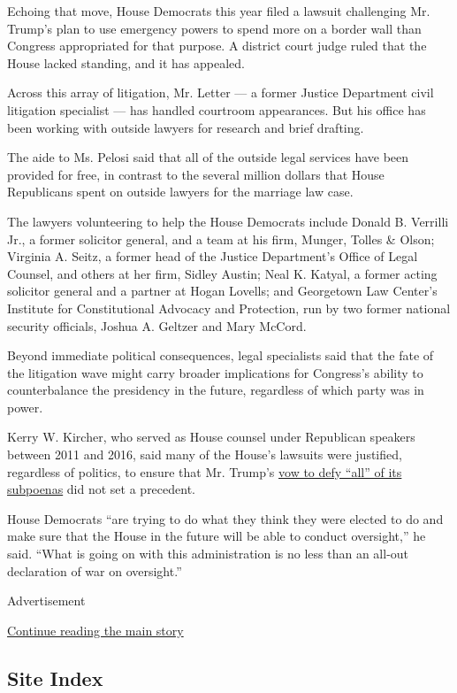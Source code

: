 Echoing that move, House Democrats this year filed a lawsuit challenging
Mr. Trump's plan to use emergency powers to spend more on a border wall
than Congress appropriated for that purpose. A district court judge
ruled that the House lacked standing, and it has appealed.

Across this array of litigation, Mr. Letter --- a former Justice
Department civil litigation specialist --- has handled courtroom
appearances. But his office has been working with outside lawyers for
research and brief drafting.

The aide to Ms. Pelosi said that all of the outside legal services have
been provided for free, in contrast to the several million dollars that
House Republicans spent on outside lawyers for the marriage law case.

The lawyers volunteering to help the House Democrats include Donald B.
Verrilli Jr., a former solicitor general, and a team at his firm,
Munger, Tolles \& Olson; Virginia A. Seitz, a former head of the Justice
Department's Office of Legal Counsel, and others at her firm, Sidley
Austin; Neal K. Katyal, a former acting solicitor general and a partner
at Hogan Lovells; and Georgetown Law Center's Institute for
Constitutional Advocacy and Protection, run by two former national
security officials, Joshua A. Geltzer and Mary McCord.

Beyond immediate political consequences, legal specialists said that the
fate of the litigation wave might carry broader implications for
Congress's ability to counterbalance the presidency in the future,
regardless of which party was in power.

Kerry W. Kircher, who served as House counsel under Republican speakers
between 2011 and 2016, said many of the House's lawsuits were justified,
regardless of politics, to ensure that Mr. Trump's
\href{https://www.nytimes.com/2019/04/24/us/politics/donald-trump-subpoenas.html}{vow
to defy ``all'' of its subpoenas} did not set a precedent.

House Democrats ``are trying to do what they think they were elected to
do and make sure that the House in the future will be able to conduct
oversight,'' he said. ``What is going on with this administration is no
less than an all-out declaration of war on oversight.''

Advertisement

\protect\hyperlink{after-bottom}{Continue reading the main story}

\hypertarget{site-index}{%
\subsection{Site Index}\label{site-index}}

